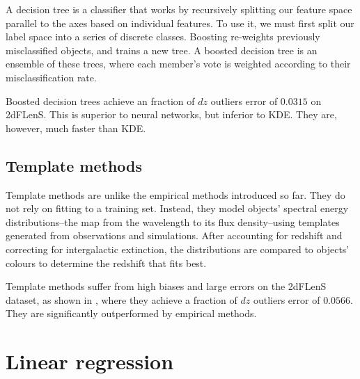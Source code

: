 \documentclass[11pt,twoside,openright]{report}
\begin{document}
A decision tree is a classifier that works by recursively splitting our feature space parallel to the axes based on individual features. To use it, we must first split our label space into a series of discrete classes. Boosting re-weights previously misclassified objects, and trains a new tree. \citep{BoostedDecisionTrees} A boosted decision tree is an ensemble of these trees, where each member's vote is weighted according to their misclassification rate.

Boosted decision trees achieve an fraction of $dz$ outliers error of $0.0315$ on 2dFLenS. \citep{PNNs} This is superior to neural networks, but inferior to KDE. They are, however, much faster than KDE.

\subsection{Template methods}

Template methods are unlike the empirical methods introduced so far. They do not rely on fitting to a training set. Instead, they model objects' spectral energy distributions--the map from the wavelength to its flux density--using templates generated from observations and simulations. After accounting for redshift and correcting for intergalactic extinction, the distributions are compared to objects' colours to determine the redshift that fits best. \citep{Templates}

Template methods suffer from high biases and large errors on the 2dFLenS dataset, as shown in \citep{Chris}, where they achieve a fraction of $dz$ outliers error of $0.0566$. They are significantly outperformed by empirical methods.

\section{Linear regression}
\label{sec:linreg}
\end{document}
